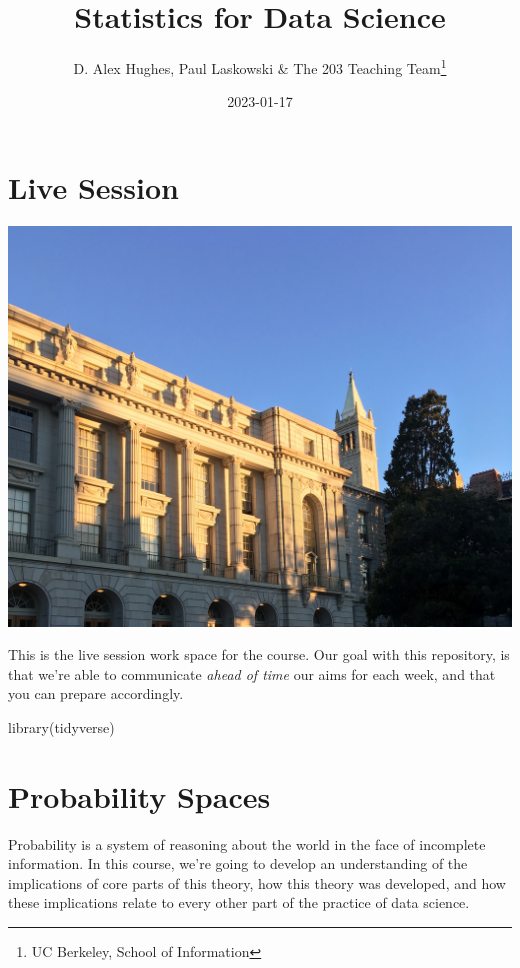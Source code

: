 \documentclass[
]{book}
\title{Statistics for Data Science}
\author{D. Alex Hughes, Paul Laskowski \& The 203 Teaching Team\footnote{UC Berkeley, School of Information}}
\date{2023-01-17}
\newenvironment{Shaded}{\begin{snugshade}}{\end{snugshade}}
\newcommand{\FunctionTok}[1]{\textcolor[rgb]{0.00,0.00,0.00}{#1}}
\newcommand{\NormalTok}[1]{#1}
\theoremstyle{definition}
\theoremstyle{definition}
\theoremstyle{definition}
\theoremstyle{definition}
\theoremstyle{remark}
\begin{document}
\maketitle

{
\setcounter{tocdepth}{1}
\tableofcontents
}
\hypertarget{live-session}{%
\chapter{Live Session}\label{live-session}}

\includegraphics{./images/campus.jpeg}

This is the live session work space for the course. Our goal with this repository, is that we're able to communicate \emph{ahead of time} our aims for each week, and that you can prepare accordingly.

\begin{Shaded}
\begin{Highlighting}[]
\FunctionTok{library}\NormalTok{(tidyverse)}
\end{Highlighting}
\end{Shaded}

\hypertarget{probability-spaces}{%
\chapter{Probability Spaces}\label{probability-spaces}}

Probability is a system of reasoning about the world in the face of incomplete information. In this course, we're going to develop an understanding of the implications of core parts of this theory, how this theory was developed, and how these implications relate to every other part of the practice of data science.
\end{document}
